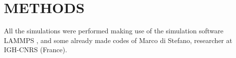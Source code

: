 \section{METHODS}
All the simulations  were performed making use of the simulation software LAMMPS
\cite{steveplimptonLAMMPS,thompsonLAMMPSFlexibleSimulation2022},
and some already made codes of Marco di Stefano, researcher at IGH-CNRS (France).












